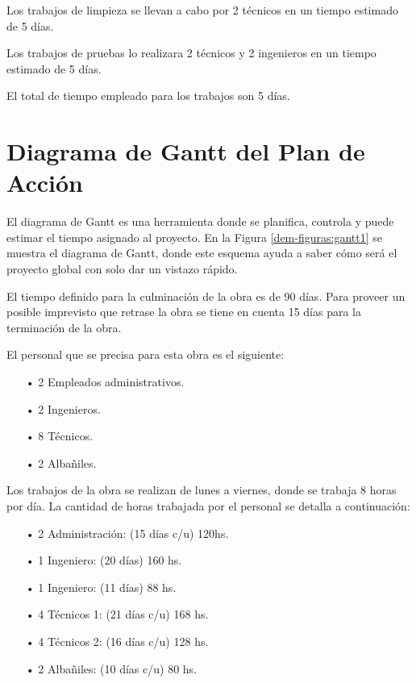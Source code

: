 Los trabajos de limpieza se llevan a cabo por 2 técnicos en un tiempo estimado de 5 días.

Los trabajos de pruebas lo realizara 2 técnicos y 2 ingenieros en un tiempo estimado de 5 días.

El total de tiempo empleado para los trabajos son 5 días.


\section{Diagrama de Gantt del Plan de Acción}

El diagrama de Gantt es una herramienta donde se planifica, controla y puede estimar el tiempo asignado al proyecto. En la Figura \ref{dem-figuras:gantt1} se muestra el diagrama de Gantt, donde este esquema ayuda a saber cómo será el proyecto global con solo dar un vistazo rápido.


El tiempo definido para la culminación de la obra es de 90 días. Para proveer un posible imprevisto que retrase la obra se tiene en cuenta 15 días para la terminación de la obra.

El personal que se precisa para esta obra es el siguiente:

\begin{itemize}


\item[•]2 Empleados administrativos.
\item[•]2 Ingenieros.
\item[•]8 Técnicos.
\item[•]2 Albañiles.

\end{itemize}


Los trabajos de la obra se realizan de lunes a viernes, donde se trabaja 8 horas por día. La cantidad de horas trabajada por el personal se detalla a continuación:


\begin{itemize}

\item[•]2 Administración: (15 días c/u) 120hs.
\item[•]1 Ingeniero: (20 días) 160 hs.
\item[•]1 Ingeniero: (11 días) 88 hs.
\item[•]4 Técnicos 1: (21 días c/u) 168 hs.
\item[•]4 Técnicos 2: (16 días c/u) 128 hs.
\item[•]2 Albañiles: (10 días c/u) 80 hs.

\end{itemize}

